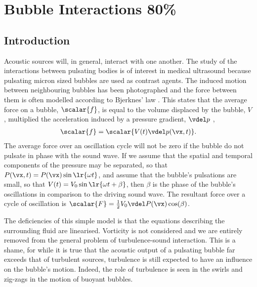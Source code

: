 \chapter{Bubble Interactions 80\%}
\section{Introduction}

Acoustic sources will, in general, interact with one another. %
The study of the interactions between pulsating bodies
is of  interest in medical ultrasound because pulsating micron sized bubbles are used as contrast agents.
The induced motion  between neighbouring bubbles has been photographed
and the force between them is often  modelled according to Bjerknes' law  \cite{Crum1971}.
This states that the average force on a bubble, $\scalar{f}$, is
equal to the volume displaced by the bubble, $V$, multiplied the acceleration 
induced by a pressure gradient, $\vdel p$ \cite{Bjerknes1905,Crum1971, Leighton1990},
\begin{align}
  \label{eqn:Bjerknes}
  \scalar{f} = \scalar{V(t)\vdel p(\vx, t)}.
\end{align}
The  average force  over an oscillation cycle will not be zero if the bubble do not pulsate in phase with the sound wave.
If we assume that the spatial and temporal components of the pressure may be separated, 
 so that  $P(\vx, t) = P(\vx)\sin\lr{\omega t}$,
 and assume that the bubble's pulsations are small, 
 so that $V(t) = V_0\sin\lr{\omega t + \beta}$,
then 
$\beta$ is the phase of the bubble's oscillations in comparison to the driving sound wave.
The resultant force over a cycle of oscillation is 
 $\scalar{F} = \frac{1}{2}V_0\vdel P(\vx) \cos(\beta)$.

The deficiencies of this simple model is that the equations describing the surrounding fluid are linearised.
Vorticity is not considered and we are entirely removed from the general problem of 
turbulence-sound interaction.
This is a shame, for while it is true that the acoustic output of a pulsating bubble far exceeds that of turbulent sources,
turbulence is still expected to have an influence on the bubble's motion.
Indeed, the role of turbulence is seen in the swirls and zig-zags in the motion of buoyant bubbles\cite{}.

